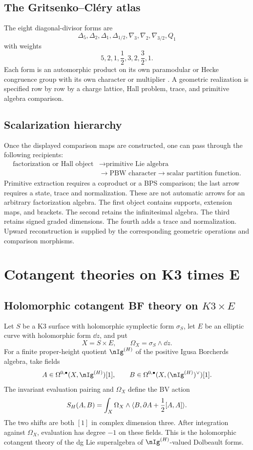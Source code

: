 \section{The Gritsenko--Cl\'ery atlas}
The eight diagonal-divisor forms are
\[
 \Delta_5,\Delta_2,\Delta_1,\Delta_{1/2},
 \nabla_3,\nabla_2,\nabla_{3/2},Q_1
\]
with weights
\[
 5,2,1,\frac12,3,2,\frac32,1.
\]
Each form is an automorphic product on its own paramodular or Hecke congruence group with its own character or multiplier \cite{GC}. A geometric realization is specified row by row by a charge lattice, Hall problem, trace, and primitive algebra comparison.

\section{Scalarization hierarchy}
Once the displayed comparison maps are constructed, one can pass
through the following recipients:
\[
\begin{aligned}
 \text{factorization or Hall object}
 &\longrightarrow \text{primitive Lie algebra}\\
 &\longrightarrow \text{PBW character}
 \longrightarrow \text{scalar partition function}.
\end{aligned}
\]
Primitive extraction requires a coproduct or a BPS comparison; the
last arrow requires a state, trace and normalization. These are not
automatic arrows for an arbitrary factorization algebra. The first object contains supports, extension maps, and brackets. The second retains the infinitesimal algebra. The third retains signed graded dimensions. The fourth adds a trace and normalization. Upward reconstruction is supplied by the corresponding geometric operations and comparison morphisms.

\chapter{Cotangent theories on K3 times E}

\section{Holomorphic cotangent BF theory on \texorpdfstring{$K3\times E$}{K3 x E}}
Let $S$ be a K3 surface with holomorphic symplectic form $\sigma_S$, let $E$ be an elliptic curve with holomorphic form $\dd z$, and put
\[
 X=S\times E,
 \qquad
 \Omega_X=\sigma_S\wedge\dd z.
\]
For a finite proper-height quotient $\nIg^{(H)}$ of the positive Igusa Borcherds algebra, take fields
\[
 A\in\Omega^{0,\bullet}(X,\nIg^{(H)})[1],
 \qquad
 B\in\Omega^{0,\bullet}(X,(\nIg^{(H)})^\vee)[1].
\]
The invariant evaluation pairing and $\Omega_X$ define the BV action
\begin{equation}\label{eq:vol4-compact-hbf}
 S_H(A,B)=
 \int_X\Omega_X\wedge
 \langle B,\partial A+\frac12[A,A]\rangle.
\end{equation}
The two shifts are both $[1]$ in complex dimension three. After
integration against $\Omega_X$, evaluation has degree $-1$ on these
fields. This is the holomorphic cotangent theory of the dg Lie
superalgebra of $\nIg^{(H)}$-valued Dolbeault forms.

